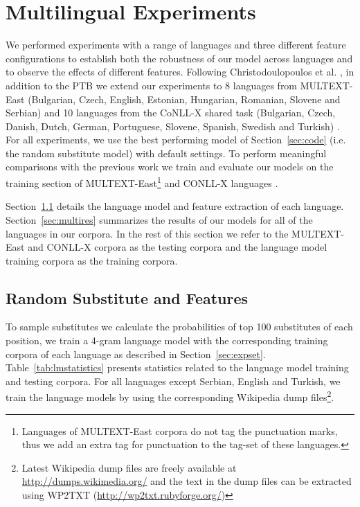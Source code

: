 \section{Multilingual Experiments}
\label{sec:multilang}
\noindent We performed experiments with a range of languages and three
different feature configurations to establish both the robustness of
our model across languages and to observe the effects of different
features.  Following Christodoulopoulos et
al. , in
addition to the PTB we extend our experiments to 8 languages from
MULTEXT-East (Bulgarian, Czech, English, Estonian, Hungarian,
Romanian, Slovene and Serbian) \cite{citeulike:5820223} and 10
languages from the CoNLL-X shared task (Bulgarian, Czech, Danish,
Dutch, German, Portuguese, Slovene, Spanish, Swedish and Turkish)
\cite{Buchholz:2006:CST:1596276.1596305}.  For all experiments, we use
the best performing model of Section~\ref{sec:code} (i.e. the random
substitute model) with default settings.  To perform meaningful
comparisons with the previous work we train and evaluate our models on
the training section of MULTEXT-East\footnote{Languages of
  MULTEXT-East corpora do not tag the punctuation marks, thus we add
  an extra tag for punctuation to the tag-set of these languages.} and
CONLL-X languages \cite{Lee:2010:STU:1870658.1870741}.

Section~\ref{sec:multivecfeat} details the language model and feature
extraction of each language.  Section~\ref{sec:multires} summarizes
the results of our models for all of the languages in our corpora.  In
the rest of this section we refer to the MULTEXT-East and CONLL-X
corpora as the testing corpora and the language model training corpora
as the training corpora.

\subsection{Random Substitute and Features}
\label{sec:multivecfeat}

To sample substitutes we calculate the probabilities of top 100
substitutes of each position, we train a 4-gram language model with
the corresponding training corpora of each language as described in
Section~\ref{sec:expset}.  Table~\ref{tab:lmstatistics} presents
statistics related to the language model training and testing corpora.
For all languages except Serbian, English and Turkish, we train the
language models by using the corresponding Wikipedia dump
files\footnote{Latest Wikipedia dump files are freely available at
  \url{http://dumps.wikimedia.org/} and the text in the dump files can
  be extracted using WP2TXT (\url{http://wp2txt.rubyforge.org/})}.

